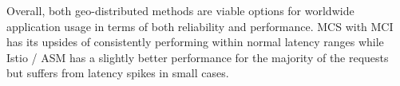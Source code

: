 

Overall, both geo-distributed methods are viable options for worldwide application usage in terms of both reliability and performance. MCS with MCI has its upsides of consistently performing within normal latency ranges while Istio / ASM has a slightly better performance for the majority of the requests but suffers from latency spikes in small cases.

